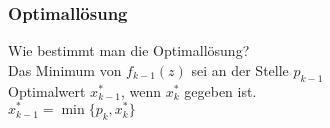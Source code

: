 \subsubsection{Optimallösung}
Wie bestimmt man die Optimallösung?\\
Das Minimum von $f_{k-1}(z)$ sei an der Stelle $p_{k-1}$\\
Optimalwert $x_{k-1}^*$, wenn $x_k^*$ gegeben ist.\\
$x_{k-1}^* = \min\{p_k, x_k^*\}$